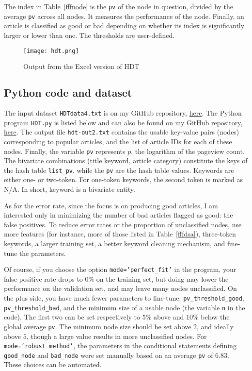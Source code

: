\documentclass[oneside,10pt]{book}
\begin{document}
The index in Table~\ref{fffnode} is the \texttt{pv} of the node in question, divided by the average \texttt{pv} across all nodes. It measures the performance of the node. Finally, an article is classified as good or bad depending on whether its index is significantly larger or lower than one. The thresholds are user-defined.


\begin{figure}%
\centering
\texttt{[image: hdt.png]}
\caption{Output from the Excel version of HDT}
\label{fig:hdt}
\end{figure}



\subsection{Python code and dataset}\label{pythourew}


The input dataset \texttt{HDTdata4.txt} is on my GitHub repository, \href{https://github.com/VincentGranville/Machine-Learning/blob/main/Source\%20Code/HDTdata4.txt}{here}. The Python program \texttt{HDT.py} is listed below and can also be found on my GitHub repository, \href{https://github.com/VincentGranville/Machine-Learning/blob/main/Source\%20Code/HDT.py}{here}. The output file \texttt{hdt-out2.txt} contains the usable key-value pairs (nodes) corresponding to popular articles, and the list of article IDs for each of these nodes. Finally, the variable \texttt{pv} represents $p$, the logarithm of the pageview count. The bivariate combinations (title keyword, article category)  constitute the
 keys of the hash table \texttt{list\_pv}, while the \texttt{pv} are the hash table values. Keywords are either one- or two-token. For one-token keywords, the second token is marked as N/A. In short, keyword is a bivariate entity.

As for the error rate, since the focus is on producing good articles, I am interested only in minimizing the number of bad articles flagged as good: the false positives.  To reduce error rates or the proportion of unclassified nodes, use more features (for instance, more of those listed in Table~\ref{fffdsa}), three-token keywords, a larger training set, a better keyword cleaning mechanism, and fine-tune the parameters.

Of course, if you choose the option \texttt{mode='perfect\_fit'} in the program, your false positive rate drops to $0\%$ on the training set, but doing may lower the
 performance on the \textcolor{index}{validation set}, and may leave many nodes unclassified.  On the plus side, you have much fewer parameters to fine-tune:
 \texttt{pv\_threshold\_good}, \texttt{pv\_threshold\_bad}, and the minimum size of a usable node (the variable \texttt{n} in the code). The first two can be set respectively to $5\%$ above and
$10\%$ below
 the global average \texttt{pv}. The minimum node size should be set above $2$, and ideally above $5$, though a large value results in more unclassified nodes.
 For \texttt{mode='robust method'}, the
 parameters in the conditional statements defining \texttt{good\_node} and \texttt{bad\_node} were set manually based on an average \texttt{pv} of $6.83$. These choices can be automated.
\end{document}
